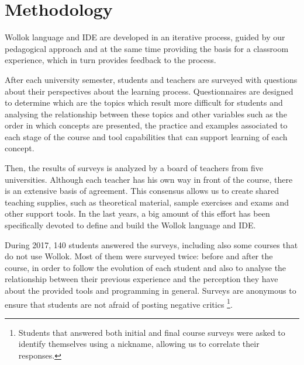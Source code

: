 \section{Methodology}
\label{sec:methodology}
Wollok language and IDE are developed in an iterative process, guided by our pedagogical approach 
and at the same time providing the basis for a classroom experience, 
which in turn provides feedback to the process.

After each university semester, students and teachers are surveyed with questions about their perspectives about the learning process.
Questionnaires are designed to determine which are the topics which result more difficult for students 
and analysing the relationship between these topics and other variables such as 
the order in which concepts are presented,
the practice and examples associated to each stage of the course
and tool capabilities that can support learning of each concept.

Then, the results of surveys is analyzed by a board of teachers from five universities.
Although each teacher has his own way in front of the course, there is an extensive basis of agreement.
This consensus allows us to create shared teaching supplies, such as theoretical material, sample exercises and exams and other support tools.
In the last years, a big amount of this effort has been specifically devoted to define and build the Wollok language and IDE.

\medskip

During 2017, 140 students answered the surveys, including also some courses that do not use Wollok.
Most of them were surveyed twice: before and after the course, in order to follow the evolution of each student
and also to analyse the relationship between their previous experience 
and the perception they have about the provided tools and programming in general.
Surveys are anonymous to ensure that students are not afraid of posting negative critics%
\footnote{Students that answered both initial and final course surveys were asked to identify themselves using a nickname, allowing us to correlate their responses.}.


